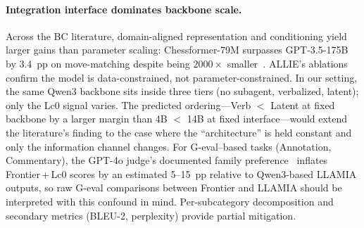 \paragraph{Integration interface dominates backbone scale.}
Across the BC literature, domain-aligned representation and conditioning
yield larger gains than parameter scaling: Chessformer-79M surpasses
GPT-3.5-175B by 3.4~pp on move-matching despite being $2000{\times}$
smaller~\cite{XXX_chessformer,zhang2024humanalignedchessbitsearch}.
ALLIE's ablations confirm the model is data-constrained, not
parameter-constrained.
In our setting, the same Qwen3 backbone sits inside three tiers (no
subagent, verbalized, latent); only the Lc0 signal varies.
The predicted ordering---Verb ${<}$ Latent at fixed backbone by a larger
margin than 4B ${<}$ 14B at fixed interface---would extend the literature's
finding to the case where the ``architecture'' is held constant and only the
information channel changes.
For G-eval--based tasks (Annotation, Commentary), the GPT-4o judge's
documented family preference~\cite{XXX_panickssery2024} inflates
Frontier\,+\,Lc0 scores by an estimated 5--15~pp relative to Qwen3-based
LLAMIA outputs, so raw G-eval comparisons between Frontier and LLAMIA
should be interpreted with this confound in mind.
Per-subcategory decomposition and secondary metrics (BLEU-2, perplexity)
provide partial mitigation.
